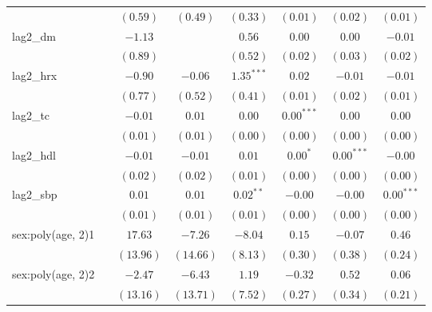 \begin{tabular}{l c c c c c c c}
                     &               & $(0.59)$      & $(0.49)$    & $(0.33)$      & $(0.01)$      & $(0.02)$      & $(0.01)$      \\
lag2\_dm             &               & $-1.13$       &             & $0.56$        & $0.00$        & $0.00$        & $-0.01$       \\
                     &               & $(0.89)$      &             & $(0.52)$      & $(0.02)$      & $(0.03)$      & $(0.02)$      \\
lag2\_hrx            &               & $-0.90$       & $-0.06$     & $1.35^{***}$  & $0.02$        & $-0.01$       & $-0.01$       \\
                     &               & $(0.77)$      & $(0.52)$    & $(0.41)$      & $(0.01)$      & $(0.02)$      & $(0.01)$      \\
lag2\_tc             &               & $-0.01$       & $0.01$      & $0.00$        & $0.00^{***}$  & $0.00$        & $0.00$        \\
                     &               & $(0.01)$      & $(0.01)$    & $(0.00)$      & $(0.00)$      & $(0.00)$      & $(0.00)$      \\
lag2\_hdl            &               & $-0.01$       & $-0.01$     & $0.01$        & $0.00^{*}$    & $0.00^{***}$  & $-0.00$       \\
                     &               & $(0.02)$      & $(0.02)$    & $(0.01)$      & $(0.00)$      & $(0.00)$      & $(0.00)$      \\
lag2\_sbp            &               & $0.01$        & $0.01$      & $0.02^{**}$   & $-0.00$       & $-0.00$       & $0.00^{***}$  \\
                     &               & $(0.01)$      & $(0.01)$    & $(0.01)$      & $(0.00)$      & $(0.00)$      & $(0.00)$      \\
sex:poly(age, 2)1    &               & $17.63$       & $-7.26$     & $-8.04$       & $0.15$        & $-0.07$       & $0.46$        \\
                     &               & $(13.96)$     & $(14.66)$   & $(8.13)$      & $(0.30)$      & $(0.38)$      & $(0.24)$      \\
sex:poly(age, 2)2    &               & $-2.47$       & $-6.43$     & $1.19$        & $-0.32$       & $0.52$        & $0.06$        \\
                     &               & $(13.16)$     & $(13.71)$   & $(7.52)$      & $(0.27)$      & $(0.34)$      & $(0.21)$      \\

\end{tabular}
